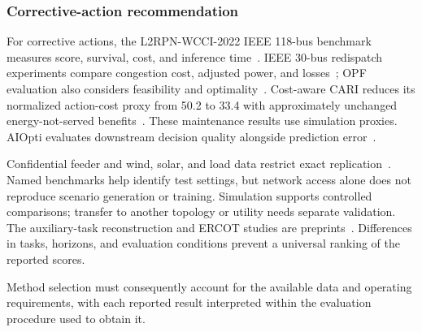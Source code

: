 \subsubsection{Corrective-action recommendation}
For corrective actions, the L2RPN-WCCI-2022 IEEE 118-bus benchmark measures score, survival, cost, and inference time~\cite{S08}. IEEE 30-bus redispatch experiments compare congestion cost, adjusted power, and losses~\cite{S09}; OPF evaluation also considers feasibility and optimality~\cite{S05}. Cost-aware CARI reduces its normalized action-cost proxy from 50.2 to 33.4 with approximately unchanged energy-not-served benefits~\cite{S38}. These maintenance results use simulation proxies. AIOpti evaluates downstream decision quality alongside prediction error~\cite{S37}.

Confidential feeder and wind, solar, and load data restrict exact replication~\cite{S29,S24}. Named benchmarks help identify test settings, but network access alone does not reproduce scenario generation or training. Simulation supports controlled comparisons; transfer to another topology or utility needs separate validation. The auxiliary-task reconstruction and ERCOT studies are preprints~\cite{N01,S25}. Differences in tasks, horizons, and evaluation conditions prevent a universal ranking of the reported scores.

Method selection must consequently account for the available data and operating requirements, with each reported result interpreted within the evaluation procedure used to obtain it.
